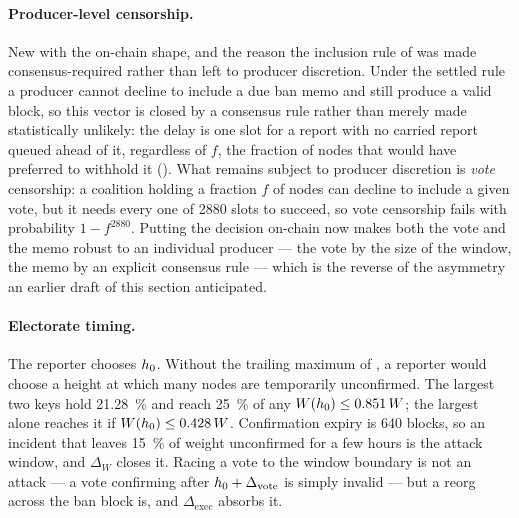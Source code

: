 \paragraph{Producer-level censorship.} New with the on-chain shape, and the reason the inclusion
rule of  was made consensus-required rather than left to producer
discretion. Under the settled rule a producer cannot decline to include a due ban memo and still
produce a valid block, so this vector is closed by a consensus rule rather than merely made
statistically unlikely: the delay is one slot for a report with no carried report queued ahead of it,
regardless of $f$, the fraction of nodes that would have preferred to withhold it
(). What remains subject to producer
discretion is \emph{vote} censorship: a coalition holding a fraction $f$ of nodes can decline to
include a given vote, but it needs every one of \num{2880} slots to succeed, so vote censorship
fails with probability $1 - f^{\num{2880}}$. Putting the decision on-chain now makes both the vote
and the memo robust to an individual producer --- the vote by the size of the window, the memo by an
explicit consensus rule --- which is the reverse of the asymmetry an earlier draft of this section
anticipated.

\paragraph{Electorate timing.} The reporter chooses $h_0$. Without the trailing maximum of
, a reporter would choose a height at which many nodes are temporarily
unconfirmed. The largest two keys hold \SI{21.28}{\percent} and reach \SI{25}{\percent} of any
$W(h_0) \le 0.851\,W$; the largest alone reaches it if
$W(h_0) \le 0.428\,W$. Confirmation expiry is 640 blocks, so an incident that leaves
\SI{15}{\percent} of weight unconfirmed for a few hours is the attack window, and $\Delta_W$ closes
it. Racing a vote to the window boundary is not an attack — a vote confirming after
$h_0 + \Delta_{\mathrm{vote}}$ is simply invalid — but a reorg across the ban block is, and
$\Delta_{\mathrm{exec}}$ absorbs it.

